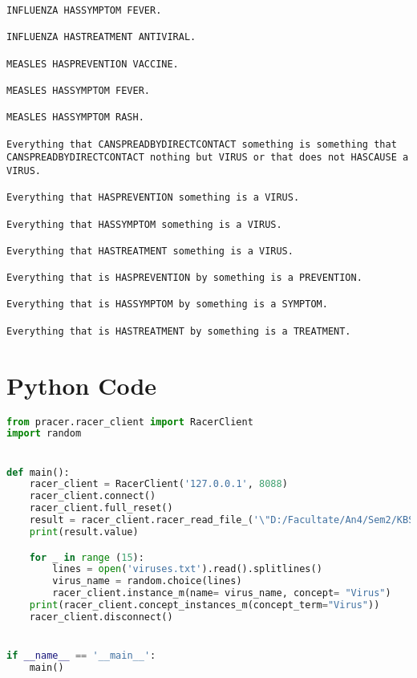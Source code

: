 \documentclass[a4paper,12pt]{report}
\begin{document}
\begin{lstlisting}
INFLUENZA HASSYMPTOM FEVER.

INFLUENZA HASTREATMENT ANTIVIRAL.

MEASLES HASPREVENTION VACCINE.

MEASLES HASSYMPTOM FEVER.

MEASLES HASSYMPTOM RASH.

Everything that CANSPREADBYDIRECTCONTACT something is something that CANSPREADBYDIRECTCONTACT nothing but VIRUS or that does not HASCAUSE a VIRUS.

Everything that HASPREVENTION something is a VIRUS.

Everything that HASSYMPTOM something is a VIRUS.

Everything that HASTREATMENT something is a VIRUS.

Everything that is HASPREVENTION by something is a PREVENTION.

Everything that is HASSYMPTOM by something is a SYMPTOM.

Everything that is HASTREATMENT by something is a TREATMENT.
\end{lstlisting}

\section{Python Code}
\lstset{style=mystyle}
\begin{lstlisting}[language=Python]
from pracer.racer_client import RacerClient
import random


def main():
    racer_client = RacerClient('127.0.0.1', 8088)
    racer_client.connect()
    racer_client.full_reset()
    result = racer_client.racer_read_file_('\"D:/Facultate/An4/Sem2/KBS/RacerFiles/ontho.racer\"')
    print(result.value)

    for _ in range (15):
        lines = open('viruses.txt').read().splitlines()
        virus_name = random.choice(lines)
        racer_client.instance_m(name= virus_name, concept= "Virus")
    print(racer_client.concept_instances_m(concept_term="Virus"))
    racer_client.disconnect()


if __name__ == '__main__':
    main()

\end{lstlisting}
\end{document}
